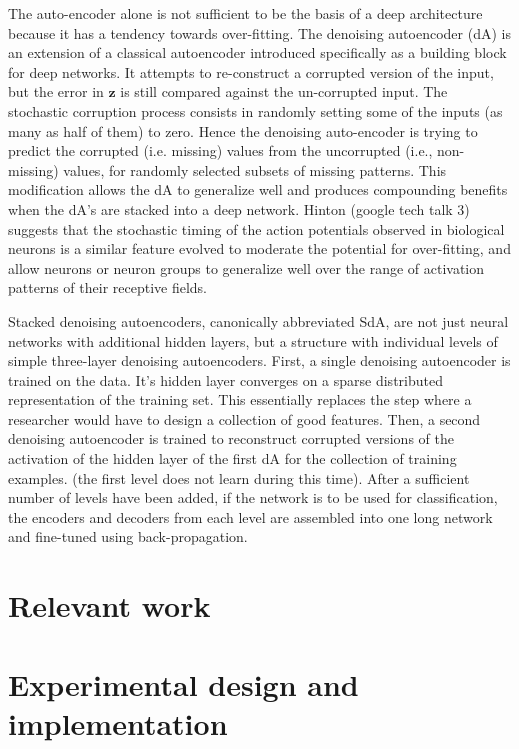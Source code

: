 \documentclass[12pt]{article}
\begin{document}
The auto-encoder alone is not sufficient to be the basis of a deep architecture because it has a tendency towards over-fitting. The denoising autoencoder (dA) is an extension of a classical autoencoder introduced specifically as a building block for deep networks\cite{Vincint08}.  It attempts to re-construct a corrupted version of the input, but the error in $\mathbf z$ is still compared against the un-corrupted input. The stochastic corruption process consists in randomly setting some of the inputs (as many as half of them) to zero. Hence the denoising auto-encoder is trying to predict the corrupted (i.e. missing) values from the uncorrupted (i.e., non-missing) values, for randomly selected subsets of missing patterns. This modification allows the dA to generalize well and produces compounding benefits when the dA's are stacked into a deep network\cite{Hinton06}. Hinton (google tech talk 3) suggests that the stochastic timing of the action potentials observed in biological neurons is a similar feature evolved to moderate the potential for over-fitting, and allow neurons or neuron groups to generalize well over the range of activation patterns of their receptive fields.
	
Stacked denoising autoencoders, canonically abbreviated SdA, are not just neural networks with additional hidden layers, but a structure with individual levels of simple three-layer denoising autoencoders. First, a single denoising autoencoder is trained on the data. It's hidden layer converges on a sparse distributed representation of the training set. This essentially replaces the step where a researcher would have to design a collection of good features. Then, a second denoising autoencoder is trained to reconstruct corrupted versions of the activation of the hidden layer of the first dA for the collection of training examples. (the first level does not learn during this time). After a sufficient number of levels have been added, if the network is to be used for classification, the encoders and decoders from each level are assembled into one long network and fine-tuned using back-propagation.
	
	\section{Relevant work}
	
	
\section{Experimental design and implementation}
\end{document}

